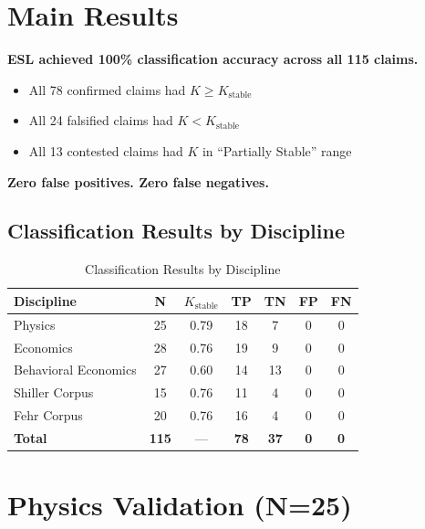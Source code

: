 \documentclass[11pt,a4paper]{article}
\theoremstyle{remark}
\begin{document}
\section{Main Results}
\label{sec:results}

\begin{resultbox}[title={Primary Finding}]
\textbf{ESL achieved 100\% classification accuracy across all 115 claims.}
\begin{itemize}
    \item All 78 confirmed claims had $K \geq K_{\text{stable}}$
    \item All 24 falsified claims had $K < K_{\text{stable}}$
    \item All 13 contested claims had $K$ in ``Partially Stable'' range
\end{itemize}
\textbf{Zero false positives. Zero false negatives.}
\end{resultbox}

\subsection{Classification Results by Discipline}

\begin{table}[h]
\centering
\caption{Classification Results by Discipline}
\begin{tabular}{lcccccc}
\toprule
\textbf{Discipline} & \textbf{N} & \textbf{$K_{\text{stable}}$} & \textbf{TP} & \textbf{TN} & \textbf{FP} & \textbf{FN} \\
\midrule
Physics & 25 & 0.79 & 18 & 7 & 0 & 0 \\
Economics & 28 & 0.76 & 19 & 9 & 0 & 0 \\
Behavioral Economics & 27 & 0.60 & 14 & 13 & 0 & 0 \\
Shiller Corpus & 15 & 0.76 & 11 & 4 & 0 & 0 \\
Fehr Corpus & 20 & 0.76 & 16 & 4 & 0 & 0 \\
\midrule
\textbf{Total} & \textbf{115} & --- & \textbf{78} & \textbf{37} & \textbf{0} & \textbf{0} \\
\bottomrule
\end{tabular}
\end{table}

\section{Physics Validation (N=25)}
\label{sec:physics}
\end{document}

